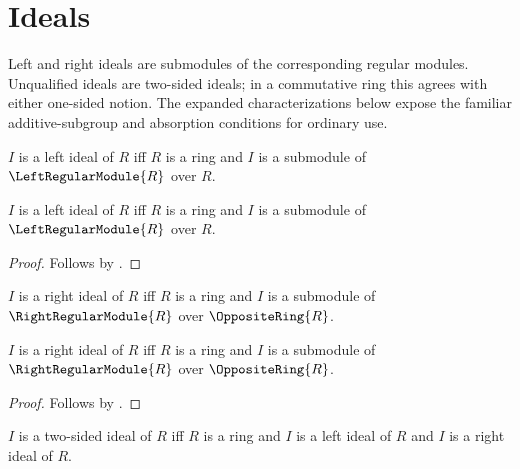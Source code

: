 






\section{Ideals}

Left and right ideals are submodules of the corresponding regular modules.
Unqualified ideals are two-sided ideals; in a commutative ring this agrees
with either one-sided notion.  The expanded characterizations below expose
the familiar additive-subgroup and absorption conditions for ordinary use.

\begin{definition}\label{left_ideal}
    $I$ is a left ideal of $R$ iff
        $R$ is a ring and
        $I$ is a submodule of $\LeftRegularModule{R}$ over $R$.
\end{definition}

\begin{proposition}\label{left_ideal_iff}
    $I$ is a left ideal of $R$ iff
        $R$ is a ring and
        $I$ is a submodule of $\LeftRegularModule{R}$ over $R$.
\end{proposition}
\begin{proof}
    Follows by .
\end{proof}

\begin{definition}\label{right_ideal}
    $I$ is a right ideal of $R$ iff
        $R$ is a ring and
        $I$ is a submodule of $\RightRegularModule{R}$ over
            $\OppositeRing{R}$.
\end{definition}

\begin{proposition}\label{right_ideal_iff}
    $I$ is a right ideal of $R$ iff
        $R$ is a ring and
        $I$ is a submodule of $\RightRegularModule{R}$ over
            $\OppositeRing{R}$.
\end{proposition}
\begin{proof}
    Follows by .
\end{proof}

\begin{definition}\label{two_sided_ideal}
    $I$ is a two-sided ideal of $R$ iff
        $R$ is a ring and
        $I$ is a left ideal of $R$ and
        $I$ is a right ideal of $R$.
\end{definition}

